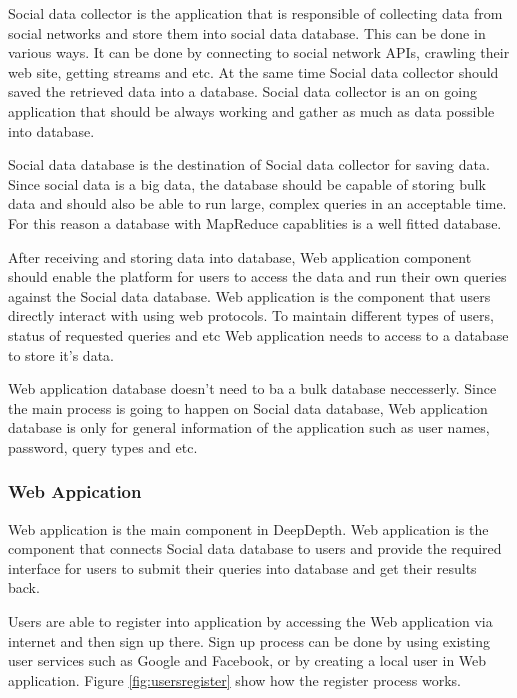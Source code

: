 \documentclass[a4paper,11pt]{report}
\begin{document}
Social data collector is the application that is responsible of collecting data from social networks and store them into social data database. This can be done in various ways. It can be done by connecting to social network APIs, crawling their web site, getting streams and etc. At the same time Social data collector should saved the retrieved data into a database. Social data collector is an on going application that should be always working and gather as much as data possible into database.

Social data database is the destination of Social data collector for saving data. Since social data is a big data, the database should be capable of storing bulk data and should also be able to run large, complex queries in an acceptable time. For this reason a database with MapReduce capablities is a well fitted database.

After receiving and storing data into database, Web application component should enable the platform for users to access the data and run their own queries against the Social data database. Web application is the component that users directly interact with using web protocols. To maintain different types of users, status of requested queries and etc Web application needs to access to a database to store it's data.

Web application database doesn't need to ba a bulk database neccesserly. Since the main process is going to happen on Social data database, Web application database is only for general information of the application such as user names, password, query types and etc.

\subsubsection{Web Appication}

Web application is the main component in DeepDepth. Web application is the component that connects Social data database to users and provide the required interface for users to submit their queries into database and get their results back.

Users are able to register into application by accessing the Web application via internet and then sign up there. Sign up process can be done by using existing user services such as Google and Facebook, or by creating a local user in Web application. Figure \ref{fig:usersregister} show how the register process works.
\end{document}
